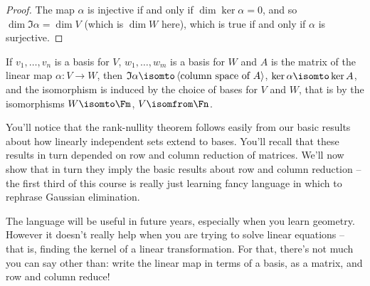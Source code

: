 \begin{proof}
	The map $\alpha$ is injective if and only if $\dim\ker\alpha=0$, and so $\dim\Im\alpha = \dim V$ (which is $\dim W$ here), which is true if and only if $\alpha$ is surjective. %
\end{proof}

\begin{remark}
	If $v_1,\ldots,v_n$ is a basis for $V$, $w_1,\ldots,w_m$ is a basis for $W$ and $A$ is the matrix of the linear map $\alpha:V\to W$, then $\Im \alpha \isomto \left\langle \text{column space of } A \right\rangle$, $ \ker\alpha \isomto \ker A$, and the isomorphism is induced by the choice of bases for $V$ and $W$, that is by the isomorphisms $W\isomto \Fm$, $V\isomfrom\Fn$. %
\end{remark}

\begin{remark}
	You'll notice that the rank-nullity theorem follows easily from our basic results about how linearly independent sets extend to bases. %
	You'll recall that these results in turn depended on row and column reduction of matrices. We'll now show that in turn they imply the basic results about row and column reduction -- the first third of this course is really just learning fancy language in which to rephrase Gaussian elimination. %

	The language will be useful in future years, especially when you learn geometry. However it doesn't really help when you are trying to solve linear equations -- that is, finding the kernel of a linear transformation. For that, there's not much you can say other than: write the linear map in terms of a basis, as a matrix, and row and column reduce! %
\end{remark}


